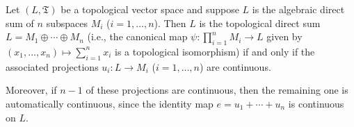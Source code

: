 Let $(L, \mathfrak{T})$ be a topological vector space and suppose $L$ is the algebraic direct sum of $n$ subspaces $M_i$ ($i = 1, \ldots, n$). Then $L$ is the topological direct sum $L = M_1 \oplus \cdots \oplus M_n$ (i.e., the canonical map $\psi : \prod_{i=1}^n M_i \to L$ given by $(x_1, \ldots, x_n) \mapsto \sum_{i=1}^n x_i$ is a topological isomorphism) if and only if the associated projections $u_i : L \to M_i$ ($i = 1, \ldots, n$) are continuous.

Moreover, if $n-1$ of these projections are continuous, then the remaining one is automatically continuous, since the identity map $e = u_1 + \cdots + u_n$ is continuous on $L$.
